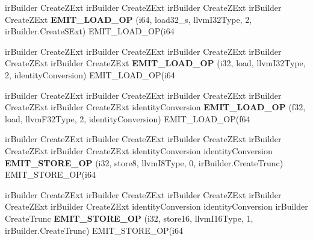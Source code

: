 \begin{DoxyCompactItemize}
ir\+Builder Create\+Z\+Ext ir\+Builder Create\+Z\+Ext ir\+Builder Create\+Z\+Ext ir\+Builder Create\+Z\+Ext {\bfseries E\+M\+I\+T\+\_\+\+L\+O\+A\+D\+\_\+\+OP} (i64, load32\+\_\+s, llvm\+I32\+Type, 2, ir\+Builder.\+Create\+S\+Ext) E\+M\+I\+T\+\_\+\+L\+O\+A\+D\+\_\+\+OP(i64
\item 
\mbox{\label{struct_l_l_v_m_j_i_t_1_1_emit_function_context_acc7c88ade76b59b2edcb081539cf8fb0}} 
ir\+Builder Create\+Z\+Ext ir\+Builder Create\+Z\+Ext ir\+Builder Create\+Z\+Ext ir\+Builder Create\+Z\+Ext ir\+Builder Create\+Z\+Ext {\bfseries E\+M\+I\+T\+\_\+\+L\+O\+A\+D\+\_\+\+OP} (i32, load, llvm\+I32\+Type, 2, identity\+Conversion) E\+M\+I\+T\+\_\+\+L\+O\+A\+D\+\_\+\+OP(i64
\item 
\mbox{\label{struct_l_l_v_m_j_i_t_1_1_emit_function_context_a222944fd69e8430b5c65719ebb19ed2a}} 
ir\+Builder Create\+Z\+Ext ir\+Builder Create\+Z\+Ext ir\+Builder Create\+Z\+Ext ir\+Builder Create\+Z\+Ext ir\+Builder Create\+Z\+Ext identity\+Conversion {\bfseries E\+M\+I\+T\+\_\+\+L\+O\+A\+D\+\_\+\+OP} (f32, load, llvm\+F32\+Type, 2, identity\+Conversion) E\+M\+I\+T\+\_\+\+L\+O\+A\+D\+\_\+\+OP(f64
\item 
\mbox{\label{struct_l_l_v_m_j_i_t_1_1_emit_function_context_a33a2bd9bcf7e0ea909b8bd93216486ec}} 
ir\+Builder Create\+Z\+Ext ir\+Builder Create\+Z\+Ext ir\+Builder Create\+Z\+Ext ir\+Builder Create\+Z\+Ext ir\+Builder Create\+Z\+Ext identity\+Conversion identity\+Conversion {\bfseries E\+M\+I\+T\+\_\+\+S\+T\+O\+R\+E\+\_\+\+OP} (i32, store8, llvm\+I8\+Type, 0, ir\+Builder.\+Create\+Trunc) E\+M\+I\+T\+\_\+\+S\+T\+O\+R\+E\+\_\+\+OP(i64
\item 
\mbox{\label{struct_l_l_v_m_j_i_t_1_1_emit_function_context_a7a2c1c9ab40d9469aa5fa6ab3dc2f997}} 
ir\+Builder Create\+Z\+Ext ir\+Builder Create\+Z\+Ext ir\+Builder Create\+Z\+Ext ir\+Builder Create\+Z\+Ext ir\+Builder Create\+Z\+Ext identity\+Conversion identity\+Conversion ir\+Builder Create\+Trunc {\bfseries E\+M\+I\+T\+\_\+\+S\+T\+O\+R\+E\+\_\+\+OP} (i32, store16, llvm\+I16\+Type, 1, ir\+Builder.\+Create\+Trunc) E\+M\+I\+T\+\_\+\+S\+T\+O\+R\+E\+\_\+\+OP(i64
\item 
\mbox{\label{struct_l_l_v_m_j_i_t_1_1_emit_function_context_a8d32b9f2e66688daba0f3e3114721240}} 

\end{DoxyCompactItemize}
